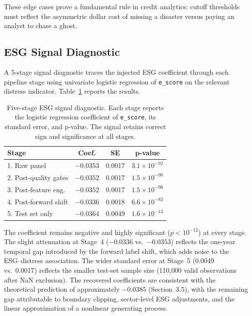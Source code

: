 \documentclass[sigconf,anonymous]{acmart}
\begin{document}
These edge cases prove a fundamental rule in credit analytics: cutoff thresholds must reflect the asymmetric dollar cost of missing a disaster versus paying an analyst to chase a ghost.

\subsection{ESG Signal Diagnostic}
\label{sec:signal_diag}
A 5-stage signal diagnostic traces the injected ESG coefficient through each pipeline stage using univariate logistic regression of \texttt{e\_score} on the relevant distress indicator. Table~\ref{tab_diagnostic} reports the results.

\begin{table}[htbp]
\caption{Five-stage ESG signal diagnostic. Each stage reports the logistic regression coefficient of \texttt{e\_score}, its standard error, and p-value. The signal retains correct sign and significance at all stages.}
\begin{center}
\begin{tabular}{lccc}
\toprule
\textbf{Stage} & \textbf{Coef.} & \textbf{SE} & \textbf{p-value} \\
\midrule
1. Raw panel & $-0.0353$ & 0.0017 & $3.1 \times 10^{-92}$ \\
2. Post-quality gates & $-0.0352$ & 0.0017 & $1.5 \times 10^{-90}$ \\
3. Post-feature eng. & $-0.0352$ & 0.0017 & $1.5 \times 10^{-90}$ \\
4. Post-forward shift & $-0.0336$ & 0.0018 & $6.6 \times 10^{-82}$ \\
5. Test set only & $-0.0364$ & 0.0049 & $1.6 \times 10^{-13}$ \\
\bottomrule
\end{tabular}
\label{tab_diagnostic}
\end{center}
\end{table}

The coefficient remains negative and highly significant ($p < 10^{-12}$) at every stage. The slight attenuation at Stage~4 ($-0.0336$ vs.\ $-0.0353$) reflects the one-year temporal gap introduced by the forward label shift, which adds noise to the ESG--distress association. The wider standard error at Stage~5 (0.0049 vs.\ 0.0017) reflects the smaller test-set sample size (110,000 valid observations after NaN exclusion). The recovered coefficients are consistent with the theoretical prediction of approximately $-0.0385$ (Section~3.5), with the remaining gap attributable to boundary clipping, sector-level ESG adjustments, and the linear approximation of a nonlinear generating process.
\end{document}
